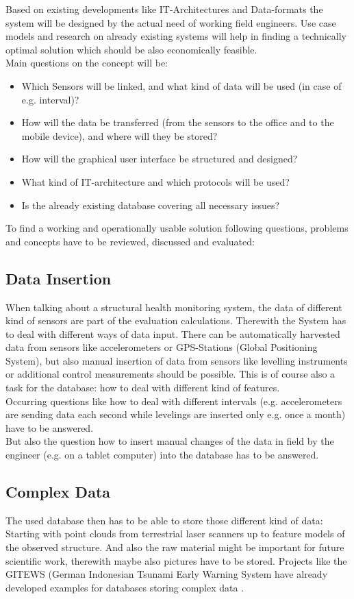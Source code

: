 Based on existing developments like IT-Architectures and Data-formats the system will be designed by the actual need of working field engineers. Use case models and research on already existing systems will help in finding a technically optimal solution which should be also economically feasible.\\
Main questions on the concept will be:
\begin{itemize}
\item Which Sensors will be linked, and what kind of data will be used (in case of e.g. interval)?
\item How will the data be transferred (from the sensors to the office and to the mobile device), and where will they be stored?
\item How will the graphical user interface be structured and designed?
\item What kind of IT-architecture and which protocols will be used?
\item Is the already existing database covering all necessary issues?
\end{itemize}
To find a working and operationally usable solution following questions, problems and concepts have to be reviewed, discussed and evaluated:\\
\subsection{Data Insertion}
When talking about a structural health monitoring system, the data of different kind of sensors are part of the evaluation calculations. Therewith the System has to deal with different ways of data input. There can be automatically harvested data from sensors like accelerometers or GPS-Stations (Global Positioning System), but also manual insertion of data from sensors like levelling instruments or additional control measurements should be possible. This is of course also a task for the database: how to deal with different kind of features.\\
Occurring questions like how to deal with different intervals (e.g. accelerometers are sending data each second while levelings are inserted only e.g. once a month) have to be answered.\\
But also the question how to insert manual changes of the data in field by the engineer (e.g. on a tablet computer) into the database has to be answered.
\subsection{Complex Data}
The used database then has to be able to store those different kind of data: Starting with point clouds from terrestrial laser scanners up to feature models of the observed structure. And also the raw material might be important for future scientific work, therewith maybe also pictures have to be stored. Projects like the GITEWS (German Indonesian Tsunami Early Warning System have already developed examples for databases storing complex data \citep{strobl_geodatenmanagement_2007}.
